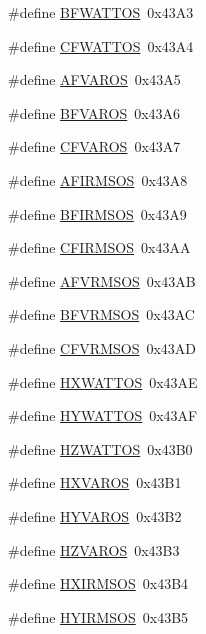 \begin{DoxyCompactItemize}
\item 
\#define \hyperlink{a00036_a218375e9d021ab6585ad6e1e4a30a36c}{B\-F\-W\-A\-T\-T\-O\-S}~0x43\-A3
\item 
\#define \hyperlink{a00036_a2e17341650906e832aa4b3e73423d3ee}{C\-F\-W\-A\-T\-T\-O\-S}~0x43\-A4
\item 
\#define \hyperlink{a00036_a73d6e254c31686af8ffba2b502b6ed0a}{A\-F\-V\-A\-R\-O\-S}~0x43\-A5
\item 
\#define \hyperlink{a00036_a1d3e2d035570dc37f6eacc4a9b736686}{B\-F\-V\-A\-R\-O\-S}~0x43\-A6
\item 
\#define \hyperlink{a00036_a130c34acd70f4dcf342291a77864e59d}{C\-F\-V\-A\-R\-O\-S}~0x43\-A7
\item 
\#define \hyperlink{a00036_a1b7700161e7c26f6642ab08eaf8ecaf3}{A\-F\-I\-R\-M\-S\-O\-S}~0x43\-A8
\item 
\#define \hyperlink{a00036_a44d186698763ef80f9ab2049a025c5db}{B\-F\-I\-R\-M\-S\-O\-S}~0x43\-A9
\item 
\#define \hyperlink{a00036_a8212d81bb40259e1b8af1cee1280ae2d}{C\-F\-I\-R\-M\-S\-O\-S}~0x43\-A\-A
\item 
\#define \hyperlink{a00036_a59402ecb8de151eeafcf2f50920c5565}{A\-F\-V\-R\-M\-S\-O\-S}~0x43\-A\-B
\item 
\#define \hyperlink{a00036_a73bf4eb0eff30f6b614b90f993b8b1a9}{B\-F\-V\-R\-M\-S\-O\-S}~0x43\-A\-C
\item 
\#define \hyperlink{a00036_a0fff4fa26b5131f743f5e67766c126ba}{C\-F\-V\-R\-M\-S\-O\-S}~0x43\-A\-D
\item 
\#define \hyperlink{a00036_a648ebd2ef4dfa6ffc1aac4bf47ddf991}{H\-X\-W\-A\-T\-T\-O\-S}~0x43\-A\-E
\item 
\#define \hyperlink{a00036_af780a31635408814bba50784eeb1f462}{H\-Y\-W\-A\-T\-T\-O\-S}~0x43\-A\-F
\item 
\#define \hyperlink{a00036_a1a18f83dbc089696501ce563808b95e3}{H\-Z\-W\-A\-T\-T\-O\-S}~0x43\-B0
\item 
\#define \hyperlink{a00036_a9ab1152e35c6f57bd448b69dd504871c}{H\-X\-V\-A\-R\-O\-S}~0x43\-B1
\item 
\#define \hyperlink{a00036_ad951210faadd462b49a760597c96ddcf}{H\-Y\-V\-A\-R\-O\-S}~0x43\-B2
\item 
\#define \hyperlink{a00036_a4769834a92cbd1fe75e81ad8082bf8c2}{H\-Z\-V\-A\-R\-O\-S}~0x43\-B3
\item 
\#define \hyperlink{a00036_a0393132c56cc12af538a79b7ad01f4f3}{H\-X\-I\-R\-M\-S\-O\-S}~0x43\-B4
\item 
\#define \hyperlink{a00036_aac521643712ebedb26c099dd281c7d73}{H\-Y\-I\-R\-M\-S\-O\-S}~0x43\-B5

\end{DoxyCompactItemize}
